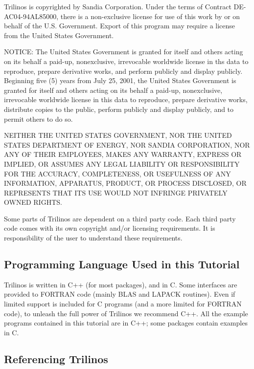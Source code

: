 Trilinos is copyrighted by Sandia Corporation. Under the terms of
Contract DE-AC04-94AL85000, there is a non-exclusive license for use of
this work by or on behalf of the U.S. Government.  Export of this
program may require a license from the United States Government.

NOTICE: The United States Government is granted for itself and others
acting on its behalf a paid-up, nonexclusive, irrevocable worldwide
license in ths data to reproduce, prepare derivative works, and perform
publicly and display publicly.  Beginning five (5) years from July 25,
2001, the United States Government is granted for itself and others
acting on its behalf a paid-up, nonexclusive, irrevocable worldwide
license in this data to reproduce, prepare derivative works, distribute
copies to the public, perform publicly and display publicly, and to
permit others to do so.

NEITHER THE UNITED STATES GOVERNMENT, NOR THE UNITED STATES DEPARTMENT
OF ENERGY, NOR SANDIA CORPORATION, NOR ANY OF THEIR EMPLOYEES, MAKES ANY
WARRANTY, EXPRESS OR IMPLIED, OR ASSUMES ANY LEGAL LIABILITY OR
RESPONSIBILITY FOR THE ACCURACY, COMPLETENESS, OR USEFULNESS OF ANY
INFORMATION, APPARATUS, PRODUCT, OR PROCESS DISCLOSED, OR REPRESENTS
THAT ITS USE WOULD NOT INFRINGE PRIVATELY OWNED RIGHTS.

\medskip

Some parts of Trilinos are dependent on a third party code. Each third
party code comes with its own copyright and/or licensing requirements.
It is responsibility of the user to understand these requirements.


\subsection{Programming Language Used in this Tutorial}
\label{sec:language}

Trilinos is written in C++ (for most packages), and in C. Some
interfaces are provided to FORTRAN code (mainly BLAS and LAPACK
routines). Even if limited support is included for C programs (and a
more limited for FORTRAN code), to unleash the full power of Trilinos we
recommend C++. All the example programs contained in this tutorial are
in C++; some packages contain examples in C.


\subsection{Referencing Trilinos}
\label{sec:referencing}

